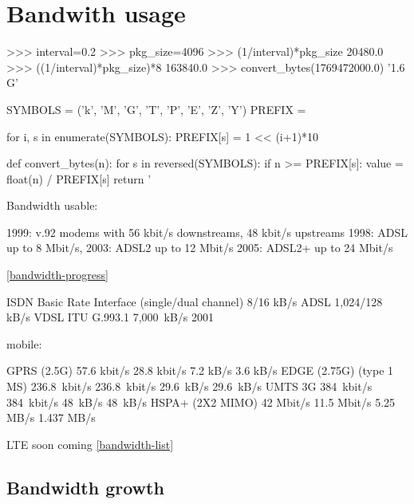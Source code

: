 \section{Bandwith usage}
>>> interval=0.2
>>> pkg_size=4096
>>> (1/interval)*pkg_size
20480.0
>>> ((1/interval)*pkg_size)*8
163840.0
>>> convert_bytes(1769472000.0)
'1.6 G'


SYMBOLS = ('k', 'M', 'G', 'T', 'P', 'E', 'Z', 'Y')
PREFIX = {}

for i, s in enumerate(SYMBOLS):
    PREFIX[s] = 1 << (i+1)*10

def convert_bytes(n):
    for s in reversed(SYMBOLS):
        if n >= PREFIX[s]:
            value = float(n) / PREFIX[s] 
            return '%

Bandwidth usable:

1999: v.92 modems with 56 kbit/s downstreams, 48 kbit/s upstreams
1998: ADSL up to 8 Mbit/s,
2003: ADSL2 up to 12 Mbit/s
2005: ADSL2+ up to 24 Mbit/s

\ref{bandwidth-progress}

ISDN Basic Rate Interface (single/dual channel) 8/16 kB/s
ADSL 1,024/128 kB/s 
VDSL ITU G.993.1    7,000 kB/s   2001

mobile:

GPRS (2.5G) 57.6 kbit/s 28.8 kbit/s 7.2 kB/s    3.6 kB/s
EDGE (2.75G) (type 1 MS)    236.8 kbit/s    236.8 kbit/s    29.6 kB/s   29.6 kB/s
UMTS 3G 384 kbit/s  384 kbit/s  48 kB/s 48 kB/s
HSPA+ (2X2 MIMO)    42 Mbit/s   11.5 Mbit/s 5.25 MB/s   1.437 MB/s

LTE soon coming
\ref{bandwidth-list}

\subsection{Bandwidth growth}

